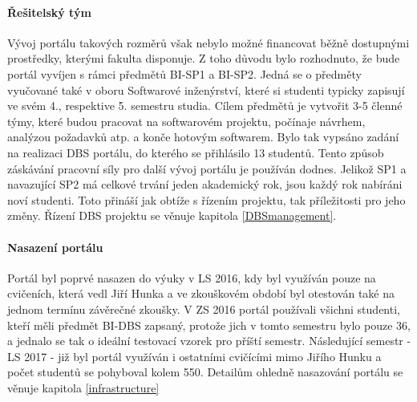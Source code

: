 \paragraph{Řešitelský tým}
Vývoj portálu takových rozměrů však nebylo možné financovat běžně dostupnými prostředky, kterými fakulta disponuje. Z toho důvodu bylo rozhodnuto, že bude portál vyvíjen s rámci předmětů BI-SP1 a BI-SP2. Jedná se o předměty vyučované také v oboru Softwarové inženýrství, které si studenti typicky zapisují ve svém 4., respektive 5. semestru studia. Cílem předmětů je vytvořit 3-5 členné týmy, které budou pracovat na softwarovém projektu, počínaje návrhem, analýzou požadavků atp. a konče hotovým softwarem. Bylo tak vypsáno zadání na realizaci DBS portálu, do kterého se přihlásilo 13 studentů.
Tento způsob záskávání pracovní síly pro další vývoj portálu je používán dodnes. Jelikož SP1 a navazující SP2 má celkové trvání jeden akademický rok, jsou každý rok nabíráni noví studenti. Toto přináší jak obtíže s řízením projektu, tak příležitosti pro jeho změny. Řízení DBS projektu se věnuje kapitola \ref{DBSmanagement}.

\paragraph{Nasazení portálu}
Portál byl poprvé nasazen do výuky v LS 2016, kdy byl využíván pouze na cvičeních, která vedl Jiří Hunka a ve zkouškovém období byl otestován také na jednom termínu závěrečné zkoušky.
V ZS 2016 portál používali všichni studenti, kteří měli předmět BI-DBS zapsaný, protože jich v tomto semestru bylo pouze 36, a jednalo se tak o ideální testovací vzorek pro příští semestr. Následující semestr - LS 2017 - již byl portál využíván i ostatními cvičícími mimo Jiřího Hunku a počet studentů se pohyboval kolem 550. Detailům ohledně nasazování portálu se věnuje kapitola \ref{infrastructure}
